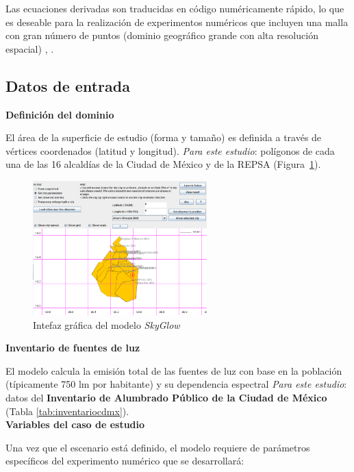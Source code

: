 Las ecuaciones derivadas son traducidas en código numéricamente rápido, lo que es deseable para la realización de experimentos numéricos que incluyen una malla con gran número de puntos (dominio geográfico grande con alta resolución espacial) \citep{Kocifaj2007}, \citep{Linares2018}.\\

\subsection{Datos de entrada}

\textbf{Definición del dominio}

El área de la superficie de estudio (forma y tamaño) es definida a través de vértices coordenados (latitud y longitud). \textit{Para este estudio}: polígonos de cada una de las 16 alcaldías de la Ciudad de México y de la REPSA (Figura~\ref{ciudaddemexicomodelo}).

\newpage

\begin{figure}
  \centering
    \includegraphics[width=0.6\textwidth]{ciudaddemexicomodelo}
  \caption{Intefaz gráfica del modelo \textit{SkyGlow}}
  \label{ciudaddemexicomodelo}
\end{figure}

\textbf{Inventario de fuentes de luz}

El modelo calcula la emisión total de las fuentes de luz con base en la población (típicamente 750 lm por habitante) y su dependencia espectral \textit{Para este estudio}: datos del \textbf{Inventario de Alumbrado Público de la Ciudad de México} (Tabla \ref{tab:inventariocdmx}).\\

\textbf{Variables del caso de estudio}

Una vez que el escenario está definido, el modelo requiere de parámetros específicos del experimento numérico que se desarrollará:

